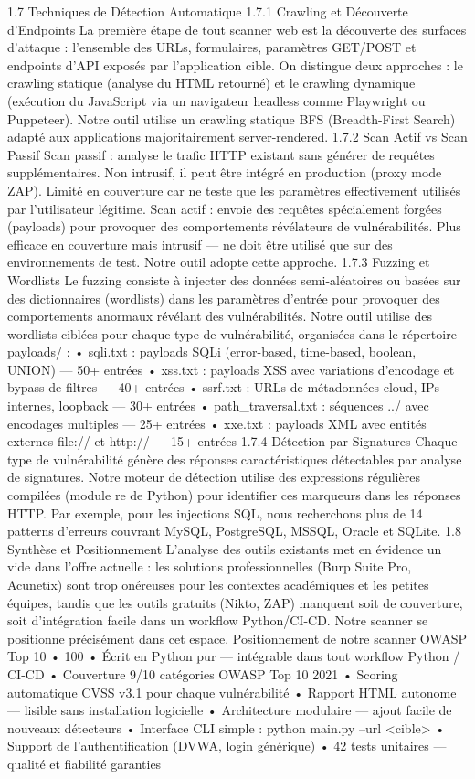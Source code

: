 1.7  Techniques de Détection Automatique
1.7.1  Crawling et Découverte d'Endpoints
La première étape de tout scanner web est la découverte des surfaces d'attaque : l'ensemble des URLs, formulaires, paramètres GET/POST et endpoints d'API exposés par l'application cible. On distingue deux approches : le crawling statique (analyse du HTML retourné) et le crawling dynamique (exécution du JavaScript via un navigateur headless comme Playwright ou Puppeteer). Notre outil utilise un crawling statique BFS (Breadth-First Search) adapté aux applications majoritairement server-rendered.
1.7.2  Scan Actif vs Scan Passif
Scan passif : analyse le trafic HTTP existant sans générer de requêtes supplémentaires. Non intrusif, il peut être intégré en production (proxy mode ZAP). Limité en couverture car ne teste que les paramètres effectivement utilisés par l'utilisateur légitime.
Scan actif : envoie des requêtes spécialement forgées (payloads) pour provoquer des comportements révélateurs de vulnérabilités. Plus efficace en couverture mais intrusif — ne doit être utilisé que sur des environnements de test. Notre outil adopte cette approche.
1.7.3  Fuzzing et Wordlists
Le fuzzing consiste à injecter des données semi-aléatoires ou basées sur des dictionnaires (wordlists) dans les paramètres d'entrée pour provoquer des comportements anormaux révélant des vulnérabilités. Notre outil utilise des wordlists ciblées pour chaque type de vulnérabilité, organisées dans le répertoire payloads/ :
•	sqli.txt : payloads SQLi (error-based, time-based, boolean, UNION) — 50+ entrées
•	xss.txt : payloads XSS avec variations d'encodage et bypass de filtres — 40+ entrées
•	ssrf.txt : URLs de métadonnées cloud, IPs internes, loopback — 30+ entrées
•	path_traversal.txt : séquences ../ avec encodages multiples — 25+ entrées
•	xxe.txt : payloads XML avec entités externes file:// et http:// — 15+ entrées
1.7.4  Détection par Signatures
Chaque type de vulnérabilité génère des réponses caractéristiques détectables par analyse de signatures. Notre moteur de détection utilise des expressions régulières compilées (module re de Python) pour identifier ces marqueurs dans les réponses HTTP. Par exemple, pour les injections SQL, nous recherchons plus de 14 patterns d'erreurs couvrant MySQL, PostgreSQL, MSSQL, Oracle et SQLite.
1.8  Synthèse et Positionnement
L'analyse des outils existants met en évidence un vide dans l'offre actuelle : les solutions professionnelles (Burp Suite Pro, Acunetix) sont trop onéreuses pour les contextes académiques et les petites équipes, tandis que les outils gratuits (Nikto, ZAP) manquent soit de couverture, soit d'intégration facile dans un workflow Python/CI-CD. Notre scanner se positionne précisément dans cet espace.
Positionnement de notre scanner OWASP Top 10
   • 100 %
   • Écrit en Python pur — intégrable dans tout workflow Python / CI-CD
   • Couverture 9/10 catégories OWASP Top 10 2021
   • Scoring automatique CVSS v3.1 pour chaque vulnérabilité
   • Rapport HTML autonome — lisible sans installation logicielle
   • Architecture modulaire — ajout facile de nouveaux détecteurs
   • Interface CLI simple : python main.py --url <cible>
   • Support de l'authentification (DVWA, login générique)
   • 42 tests unitaires — qualité et fiabilité garanties

